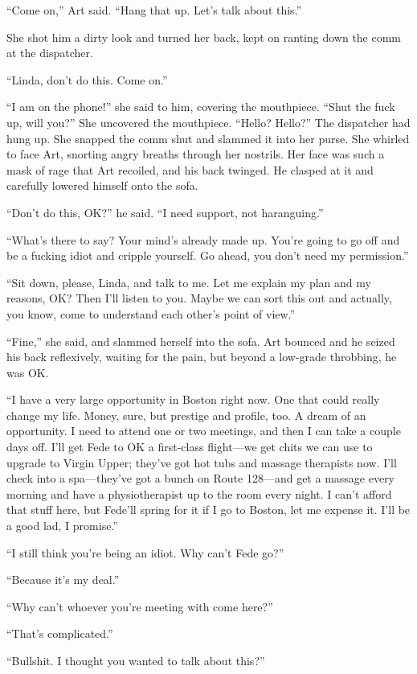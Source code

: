 “Come on,” Art said. “Hang that up. Let’s talk about this.”

She shot him a dirty look and turned her back, kept on ranting down
the comm at the dispatcher.

“Linda, don’t do this. Come on.”

“I am on the phone!” she said to him, covering the mouthpiece.
“Shut the fuck up, will you?” She uncovered the mouthpiece. “Hello?
Hello?” The dispatcher had hung up. She snapped the comm shut and
slammed it into her purse. She whirled to face Art, snorting angry
breaths through her nostrils. Her face was such a mask of rage that
Art recoiled, and his back twinged. He clasped at it and carefully
lowered himself onto the sofa.

“Don’t do this, OK?” he said. “I need support, not haranguing.”

“What’s there to say? Your mind’s already made up. You’re going to
go off and be a fucking idiot and cripple yourself. Go ahead, you
don’t need my permission.”

“Sit down, please, Linda, and talk to me. Let me explain my plan
and my reasons, OK? Then I’ll listen to you. Maybe we can sort this
out and actually, you know, come to understand each other’s point
of view.”

“Fine,” she said, and slammed herself into the sofa. Art bounced
and he seized his back reflexively, waiting for the pain, but
beyond a low-grade throbbing, he was OK.

“I have a very large opportunity in Boston right now. One that
could really change my life. Money, sure, but prestige and profile,
too. A dream of an opportunity. I need to attend one or two
meetings, and then I can take a couple days off. I’ll get Fede to
OK a first-class flight—we get chits we can use to upgrade to
Virgin Upper; they’ve got hot tubs and massage therapists now. I’ll
check into a spa—they’ve got a bunch on Route 128—and get a massage
every morning and have a physiotherapist up to the room every
night. I can’t afford that stuff here, but Fede’ll spring for it if
I go to Boston, let me expense it. I’ll be a good lad, I promise.”

“I still think you’re being an idiot. Why can’t Fede go?”

“Because it’s my deal.”

“Why can’t whoever you’re meeting with come here?”

“That’s complicated.”

“Bullshit. I thought you wanted to talk about this?”

